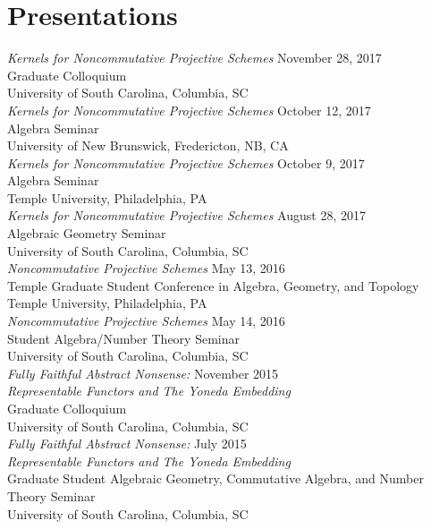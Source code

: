 \documentclass{article}
\begin{document}
\newpage
\section*{Presentations}
\textsl{Kernels for Noncommutative Projective Schemes} \hfill November 28, 2017\\
Graduate Colloquium\\
University of South Carolina, Columbia, SC\\

\noindent\textsl{Kernels for Noncommutative Projective Schemes} \hfill October 12, 2017\\
Algebra Seminar\\
University of New Brunswick, Fredericton, NB, CA\\

\noindent\textsl{Kernels for Noncommutative Projective Schemes} \hfill October 9, 2017\\
Algebra Seminar\\
Temple University, Philadelphia, PA\\

\noindent\textsl{Kernels for Noncommutative Projective Schemes} \hfill August 28, 2017\\
Algebraic Geometry Seminar\\
University of South Carolina, Columbia, SC\\

\noindent\textsl{Noncommutative Projective Schemes} \hfill May 13, 2016\\
Temple Graduate Student Conference in Algebra, Geometry, and Topology\\
Temple University, Philadelphia, PA\\

\noindent\textsl{Noncommutative Projective Schemes} \hfill May 14, 2016\\
Student Algebra/Number Theory Seminar\\
University of South Carolina, Columbia, SC\\

\noindent\textsl{Fully Faithful Abstract Nonsense:} \hfill November 2015\\
\textsl{Representable Functors and The Yoneda Embedding}\\
Graduate Colloquium\\
University of South Carolina, Columbia, SC\\

\noindent\textsl{Fully Faithful Abstract Nonsense:} \hfill July 2015\\
\textsl{Representable Functors and The Yoneda Embedding}\\
Graduate Student Algebraic Geometry, Commutative Algebra, and Number Theory Seminar\\
University of South Carolina, Columbia, SC
\end{document}
